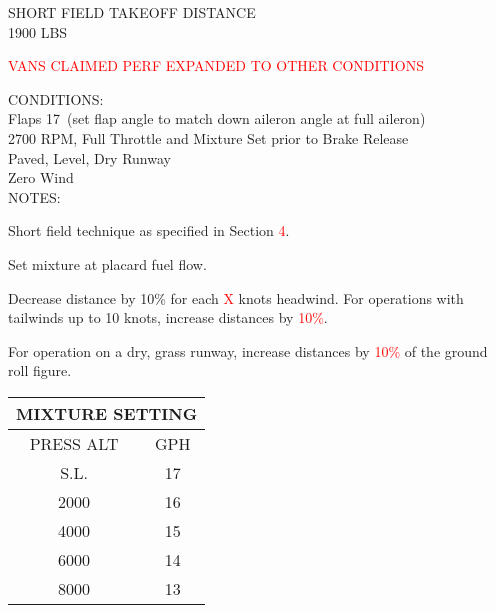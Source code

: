 \begin{sidewaysfigure}[t]
\begin{center}
\begin{perfhdr}SHORT FIELD TAKEOFF DISTANCE\\
1900 LBS
\end{perfhdr}
\Large
\textcolor{red}{VANS CLAIMED PERF EXPANDED TO OTHER CONDITIONS}\vspace{1ex}\\
\normalsize 
\begin{minipage}{7.5in}
  \begin{flushleft}
    CONDITIONS:\\
    Flaps 17\textdegree \ (set flap angle to match down aileron angle at full aileron)\\
    2700 RPM, Full Throttle and Mixture Set prior to Brake Release\\
    Paved, Level, Dry Runway\\
    Zero Wind\\
\vspace{\perfnoteskip}
    NOTES:
    \begin{enumerate*}
      \item Short field technique as specified in Section \textcolor{red}{4}.
      \item Set mixture at placard fuel flow.
      \item Decrease distance by 10\% for each \textcolor{red}{X} knots headwind.  For operations with tailwinds up to 10
      knots, increase distances by \textcolor{red}{10\%}.
      \item For operation on a dry, grass runway, increase distances by \textcolor{red}{10\%} of the ground roll figure.
      \end{enumerate*}
    \end{flushleft}
  \end{minipage}
\hfill
\begin{minipage}{1.5in}
  \begin{tabular}{|c|c|}
    \hline
    \multicolumn{2}{|c|}{MIXTURE SETTING}\\
    \hline
    PRESS ALT&GPH\\
    \hline
    S.L.&17\\
    2000&16\\
    4000&15\\
    6000&14\\
    8000&13\\
    \hline
    \end{tabular}
  \end{minipage}
\\


\end{center}
\end{sidewaysfigure}
